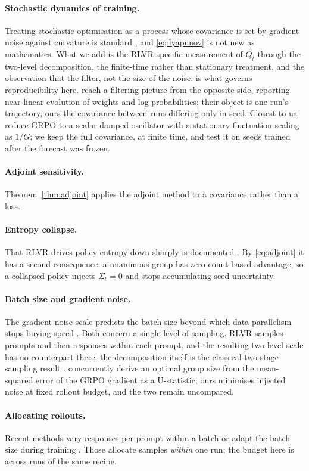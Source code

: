 \paragraph{Stochastic dynamics of training.} Treating stochastic optimisation as a process whose
covariance is set by gradient noise against curvature is standard \citep{mandt2017sgd}, and
\eqref{eq:lyapunov} is not new as mathematics. What we add is the RLVR-specific measurement of
$Q_t$ through the two-level decomposition, the finite-time rather than stationary treatment, and
the observation that the filter, not the size of the noise, is what governs reproducibility here.
\citet{wang2026linear} reach a filtering picture from the opposite side, reporting near-linear
evolution of weights and log-probabilities; their object is one run's trajectory, ours the
covariance between runs differing only in seed. Closest to us, \citet{ghosh2026predictable} reduce
GRPO to a scalar damped oscillator with a stationary fluctuation scaling as $1/G$; we keep the full
covariance, at finite time, and test it on seeds trained after the forecast was frozen.

\paragraph{Adjoint sensitivity.} Theorem~\ref{thm:adjoint} applies the adjoint method
\citep{pontryagin1962mathematical, chen2018neural} to a covariance rather than a loss.

\paragraph{Entropy collapse.} That RLVR drives policy entropy down sharply is documented
\citep{cui2025entropy}. By \eqref{eq:adjoint} it has a second consequence: a unanimous group has
zero count-based advantage, so a collapsed policy injects $\Sigma_t = 0$ and stops accumulating
seed uncertainty.

\paragraph{Batch size and gradient noise.} The gradient noise scale predicts the batch size beyond
which data parallelism stops buying speed \citep{mccandlish2018empirical, shallue2019measuring}.
Both concern a single level of sampling. RLVR samples prompts and then responses within each
prompt, and the resulting two-level scale has no counterpart there; the decomposition itself is the
classical two-stage sampling result \citep{cochran1977sampling}. \citet{zhou2026ustatistic}
concurrently derive an optimal group size from the mean-squared error of the GRPO gradient as a
U-statistic; ours minimises injected noise at fixed rollout budget, and the two remain uncompared.

\paragraph{Allocating rollouts.} Recent methods vary responses per prompt within a batch
\citep{nguyen2026allocation} or adapt the batch size during training \citep{park2026batchscaling}.
Those allocate samples \emph{within} one run; the budget here is across runs of the same recipe.